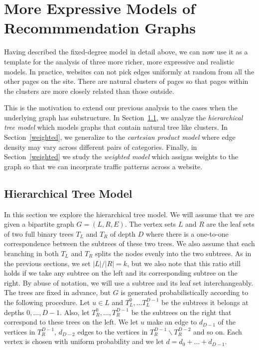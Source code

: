 \section{More Expressive Models of Recommmendation Graphs}

Having described the fixed-degree model in detail above, we can now
use it as a template for the analysis of three more richer, more
expressive and realistic models. In practice, websites can not pick
edges uniformly at random from all the other pages on the site. There
are natural clusters of pages so that pages within the clusters are
more closely related than those outside. 

This is the motivation to extend our previous analysis to the cases
when the underlying graph has substructure.  In
Section~\ref{hierarchy}, we analyze the {\em hierarchical tree model}
which models graphs that contain natural tree like clusters.  In
Section~\ref{weighted}, we generalize to the {\em cartesian product model}
where edge density may vary across different pairs of
categories. Finally, in Section~\ref{weighted} we study the {\em
  weighted model} which assigns weights to the graph so that we can
incorprate traffic patterns across a website.

\subsection{Hierarchical Tree Model}
\label{hierarchy}
In this section we explore the hierarchical tree model. We will assume
that we are given a bipartite graph $G=(L,R,E)$. The vertex sets $L$
and $R$ are the leaf sets of two full binary trees $T_L$ and $T_R$ of
depth $D$ where there is a one-to-one correspondence between the
subtrees of these two trees. We also assume that each branching in
both $T_L$ and $T_R$ splits the nodes evenly into the two
subtrees. As in the previous sections, we set $|L|/|R|=k$, but we also
note that this ratio still holds if we take any subtree on the left 
and its corresponding subtree on the right. By abuse of notation, we 
will use a subtree and its leaf set interchangeably. The trees are
fixed in advance, but $G$ is generated probabilistically according to
the following procedure. Let $u\in L$ and $T_L^0, \ldots T^{D-1}_L$ be
the subtrees it belongs at depths $0,\ldots, D-1$. Also, let 
$T_R^0,\ldots, T_R^{D-1}$ be the subtrees on the right that correspond
to these trees on the left. We let $u$ make an edge to $d_{D-1}$ of
the vertices in $T_{R}^{D-1}$, $d_{D-2}$ edges to the vertices in 
$T_{R}^{D-1} \backslash T_{R}^{D-2}$ and so on. Each vertex is chosen
with uniform probability and we let $d = d_{0} + \ldots + d_{D-1}$.\vs

